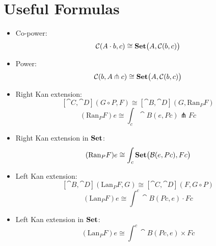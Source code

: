 \documentclass[DaoFP]{subfiles}
\begin{document}
\section{Useful Formulas}
\begin{itemize}
\item Co-power:
\[ \mathcal{C} (A \cdot b, c) \cong \mathbf{Set} \big( A, \mathcal{C} (b, c)\big) \]
\item Power:
\[ \mathcal{C} (b, A \pitchfork c) \cong \mathbf{Set}  \big(A, \mathcal{C}(b, c)\big) \]
\item Right Kan extension:
\[ [\cat C, \cat D](G \circ P, F) \cong [\cat B, \cat D](G, \text{Ran}_P F) \]
 \[ (\text{Ran}_P F) e \cong \int_c \cat B (e, P c) \pitchfork F c \]
\item Right Kan extension in $\mathbf{Set}$:
  \[ (\text{Ran}_P F) e \cong \int_c \mathbf{Set} \big( \mathcal{B} (e, P c), F c\big) \]
\item Left Kan extension:
\[ [\cat B, \cat D](\text{Lan}_P F , G) \cong  [\cat C, \cat D] (F, G \circ P) \]
\[ (\text{Lan}_P F) e \cong \int^{c} \cat B(P c, e) \cdot F c \]
\item Left Kan extension in $\mathbf{Set}$:
\[ (\text{Lan}_P F) e \cong \int^{c} \cat B (P c, e) \times F c \]


\end{itemize}
\end{document}
